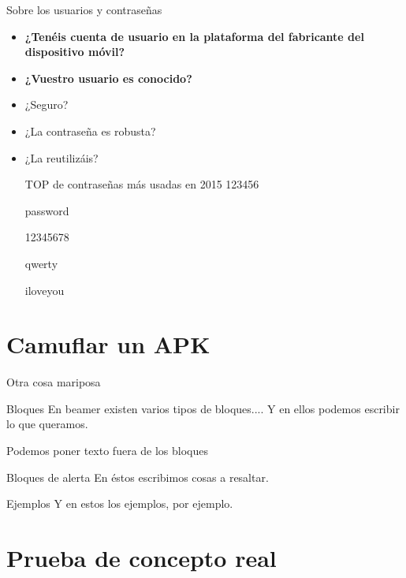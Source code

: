 \documentclass{beamer}
\begin{document}
\begin{frame}{Sobre los usuarios y contraseñas}
	
	\begin{itemize}[<+-|alert@+>]
		
		\item \textbf{¿Tenéis cuenta de usuario en la plataforma del fabricante del dispositivo móvil?}
		\item \textbf{¿Vuestro usuario es conocido?}
		\item ¿Seguro?
		\item ¿La contraseña es robusta?
		\item ¿La reutilizáis?
		
	\begin{block}{TOP de contraseñas más usadas en 2015}
		123456
		
		password
		
		12345678
		
		qwerty
		
		iloveyou
		
	\end{block}
	
	\end{itemize}
	
\end{frame}


\section{Camuflar un APK}

\begin{frame}{Otra cosa mariposa}
\begin{block}{Bloques}
En beamer existen varios tipos de bloques....
Y en ellos podemos escribir lo que queramos.
\end{block}

Podemos poner texto fuera de los bloques

\begin{alertblock}{Bloques de alerta}
En éstos escribimos cosas a resaltar.
\end{alertblock}

\begin{exampleblock}{Ejemplos}
Y en estos los ejemplos, por ejemplo.
\end{exampleblock}

\end{frame}

\section{Prueba de concepto real}
\end{document}
